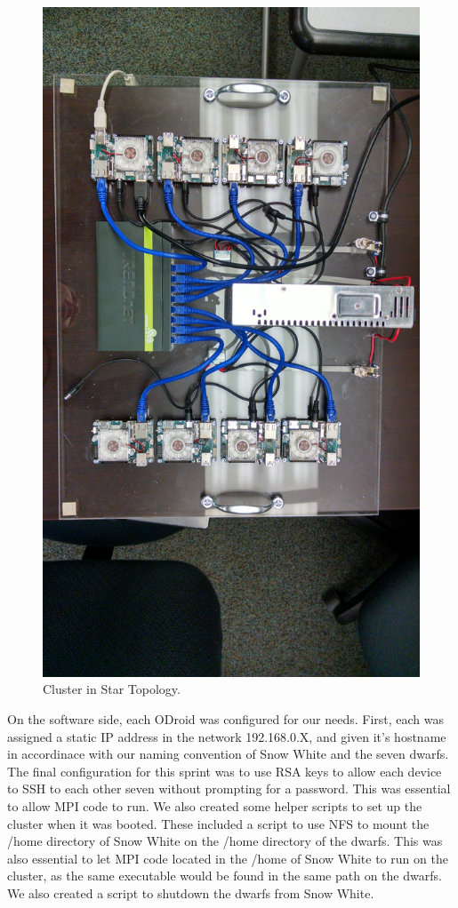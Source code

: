 \begin{figure}[h]
	\caption{Cluster in Star Topology.}
	\centering
		\includegraphics[scale=0.5]{IMG_20151201_104751350_HDR.jpg}
\end{figure}

On the software side, each ODroid was configured for our needs. First, each was assigned a static IP address in the network 192.168.0.X, and given it's hostname in accordinace with our naming convention of Snow White and the seven dwarfs. The final configuration for this sprint was to use RSA keys to allow each device to SSH to each other seven without prompting for a password. This was essential to allow MPI code to run. We also created some helper scripts to set up the cluster when it was booted. These included a script to use NFS to mount the /home directory of Snow White on the /home directory of the dwarfs. This was also essential to let MPI code located in the /home of Snow White to run on the cluster, as the same executable would be found in the same path on the dwarfs. We also created a script to shutdown the dwarfs from Snow White. 

